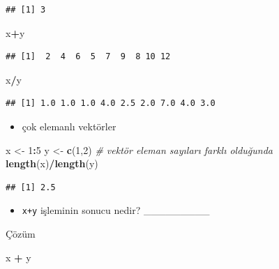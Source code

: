 \documentclass[
  oneside]{book}
\newenvironment{Shaded}{\begin{snugshade}}{\end{snugshade}}
\newcommand{\CommentTok}[1]{\textcolor[rgb]{0.56,0.35,0.01}{\textit{#1}}}
\newcommand{\DecValTok}[1]{\textcolor[rgb]{0.00,0.00,0.81}{#1}}
\newcommand{\FunctionTok}[1]{\textcolor[rgb]{0.13,0.29,0.53}{\textbf{#1}}}
\newcommand{\NormalTok}[1]{#1}
\newcommand{\OtherTok}[1]{\textcolor[rgb]{0.56,0.35,0.01}{#1}}
\newcommand{\SpecialCharTok}[1]{\textcolor[rgb]{0.81,0.36,0.00}{\textbf{#1}}}
\providecommand{\tightlist}{%
  \setlength{\itemsep}{0pt}\setlength{\parskip}{0pt}}
\begin{document}
\begin{verbatim}
## [1] 3
\end{verbatim}

\begin{Shaded}
\begin{Highlighting}[]
\NormalTok{x}\SpecialCharTok{+}\NormalTok{y}
\end{Highlighting}
\end{Shaded}

\begin{verbatim}
## [1]  2  4  6  5  7  9  8 10 12
\end{verbatim}

\begin{Shaded}
\begin{Highlighting}[]
\NormalTok{x}\SpecialCharTok{/}\NormalTok{y}
\end{Highlighting}
\end{Shaded}

\begin{verbatim}
## [1] 1.0 1.0 1.0 4.0 2.5 2.0 7.0 4.0 3.0
\end{verbatim}

\begin{itemize}
\tightlist
\item
  çok elemanlı vektörler
\end{itemize}

\begin{Shaded}
\begin{Highlighting}[]
\NormalTok{x }\OtherTok{\textless{}{-}} \DecValTok{1}\SpecialCharTok{:}\DecValTok{5}
\NormalTok{y }\OtherTok{\textless{}{-}} \FunctionTok{c}\NormalTok{(}\DecValTok{1}\NormalTok{,}\DecValTok{2}\NormalTok{)}
\CommentTok{\# vektör eleman sayıları farklı olduğunda}
\FunctionTok{length}\NormalTok{(x)}\SpecialCharTok{/}\FunctionTok{length}\NormalTok{(y)}
\end{Highlighting}
\end{Shaded}

\begin{verbatim}
## [1] 2.5
\end{verbatim}

\begin{itemize}
\tightlist
\item
  \texttt{x+y} işleminin sonucu nedir? \_\_\_\_\_\_\_\_\_
\end{itemize}

Çözüm

\begin{Shaded}
\begin{Highlighting}[]
\NormalTok{x }\SpecialCharTok{+}\NormalTok{ y}
\end{Highlighting}
\end{Shaded}
\end{document}

